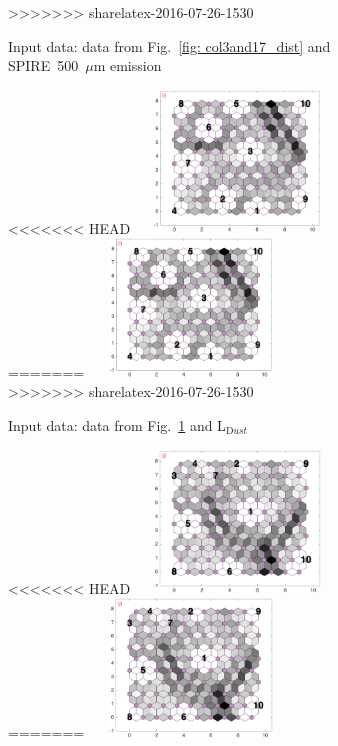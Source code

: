 \begin{figure}
\begin{subfigure}[b]{0.25\textwidth}
>>>>>>> sharelatex-2016-07-26-1530
        \caption{Input data: data from Fig.~\ref{fig: col3and17_dist} and SPIRE~500~$\mu$m emission }
        \label{fig: col3and18_dist}
    \end{subfigure}
        \hfill
    \begin{subfigure}[b]{0.25\textwidth}
        \centering
<<<<<<< HEAD
        \includegraphics[width=54mm, height=38mm]{../../images0.01/M31/2D/diff_dimension/combine_2D_data_between_cols3and19.png}
=======
        \includegraphics[width=54mm, height=37mm]{../../images0.01/M31/2D/diff_dimension/combine_2D_data_between_cols3and19.png}
>>>>>>> sharelatex-2016-07-26-1530
         \caption{Input data: data from Fig.~\ref{fig: col3and18_dist} and L$_{{\mathrm Dust}}$}
        \label{fig: col3and19_dist}
    \end{subfigure}
        \hfill
    \begin{subfigure}[b]{0.25\textwidth}
        \centering
<<<<<<< HEAD
        \includegraphics[width=54mm, height=38mm]{../../images0.01/M31/2D/diff_dimension/combine_2D_data_between_cols3and20.png}
=======
        \includegraphics[width=54mm, height=37mm]{../../images0.01/M31/2D/diff_dimension/combine_2D_data_between_cols3and20.png}

\end{subfigure}
\end{figure}
